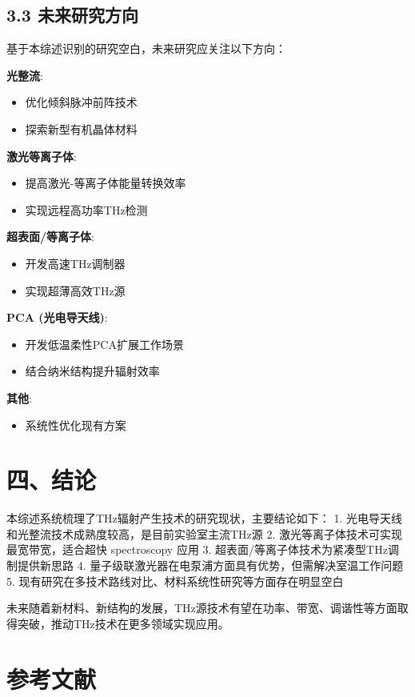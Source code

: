 \documentclass[12pt]{article}
\begin{document}
\subsection{3.3 未来研究方向}

基于本综述识别的研究空白，未来研究应关注以下方向：

\textbf{光整流}:
\begin{itemize}
\item 优化倾斜脉冲前阵技术
\item 探索新型有机晶体材料
\end{itemize}

\textbf{激光等离子体}:
\begin{itemize}
\item 提高激光-等离子体能量转换效率
\item 实现远程高功率THz检测
\end{itemize}

\textbf{超表面/等离子体}:
\begin{itemize}
\item 开发高速THz调制器
\item 实现超薄高效THz源
\end{itemize}

\textbf{PCA (光电导天线)}:
\begin{itemize}
\item 开发低温柔性PCA扩展工作场景
\item 结合纳米结构提升辐射效率
\end{itemize}

\textbf{其他}:
\begin{itemize}
\item 系统性优化现有方案
\end{itemize}


\section{四、结论}

本综述系统梳理了THz辐射产生技术的研究现状，主要结论如下：
1. 光电导天线和光整流技术成熟度较高，是目前实验室主流THz源
2. 激光等离子体技术可实现最宽带宽，适合超快 spectroscopy 应用
3. 超表面/等离子体技术为紧凑型THz调制提供新思路
4. 量子级联激光器在电泵浦方面具有优势，但需解决室温工作问题
5. 现有研究在多技术路线对比、材料系统性研究等方面存在明显空白

未来随着新材料、新结构的发展，THz源技术有望在功率、带宽、调谐性等方面取得突破，推动THz技术在更多领域实现应用。

\section{参考文献}
\end{document}
